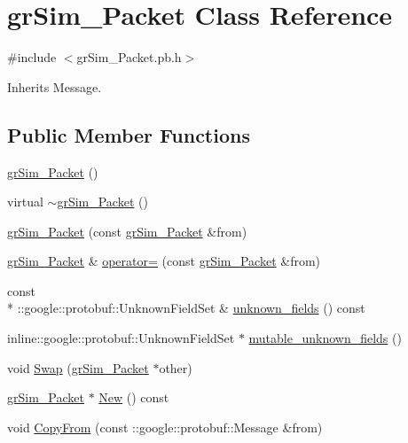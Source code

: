 \hypertarget{classgr_sim___packet}{\section{gr\-Sim\-\_\-\-Packet Class Reference}
\label{classgr_sim___packet}
}


{\ttfamily \#include $<$gr\-Sim\-\_\-\-Packet.\-pb.\-h$>$}



Inherits Message.

\subsection*{Public Member Functions}
\begin{DoxyCompactItemize}
\item 
\hyperlink{classgr_sim___packet_a133abff0b2cba34276ace8f58ce66ab6}{gr\-Sim\-\_\-\-Packet} ()
\item 
virtual \hyperlink{classgr_sim___packet_a5cd46f6a305a550db5b6ed44404e8ea7}{$\sim$gr\-Sim\-\_\-\-Packet} ()
\item 
\hyperlink{classgr_sim___packet_aa3341d66e0fe68779510227eae8849c3}{gr\-Sim\-\_\-\-Packet} (const \hyperlink{classgr_sim___packet}{gr\-Sim\-\_\-\-Packet} \&from)
\item 
\hyperlink{classgr_sim___packet}{gr\-Sim\-\_\-\-Packet} \& \hyperlink{classgr_sim___packet_a8bcb4039087f9682a701b65cd1db0349}{operator=} (const \hyperlink{classgr_sim___packet}{gr\-Sim\-\_\-\-Packet} \&from)
\item 
const \\*
\-::google\-::protobuf\-::\-Unknown\-Field\-Set \& \hyperlink{classgr_sim___packet_a04eb37a6572d87cd35bf9c0e689617c0}{unknown\-\_\-fields} () const 
\item 
inline\-::google\-::protobuf\-::\-Unknown\-Field\-Set $\ast$ \hyperlink{classgr_sim___packet_a99d1e6ccf7d03df2c49c55557c33d8b5}{mutable\-\_\-unknown\-\_\-fields} ()
\item 
void \hyperlink{classgr_sim___packet_aa52803212a08633a490fd6bd93e7e5bd}{Swap} (\hyperlink{classgr_sim___packet}{gr\-Sim\-\_\-\-Packet} $\ast$other)
\item 
\hyperlink{classgr_sim___packet}{gr\-Sim\-\_\-\-Packet} $\ast$ \hyperlink{classgr_sim___packet_abc3af91cc90c313c73652ba2e1d5bbdc}{New} () const 
\item 
void \hyperlink{classgr_sim___packet_a8f62d370d99fb62fc79c46d43731e6c3}{Copy\-From} (const \-::google\-::protobuf\-::\-Message \&from)

\end{DoxyCompactItemize}

